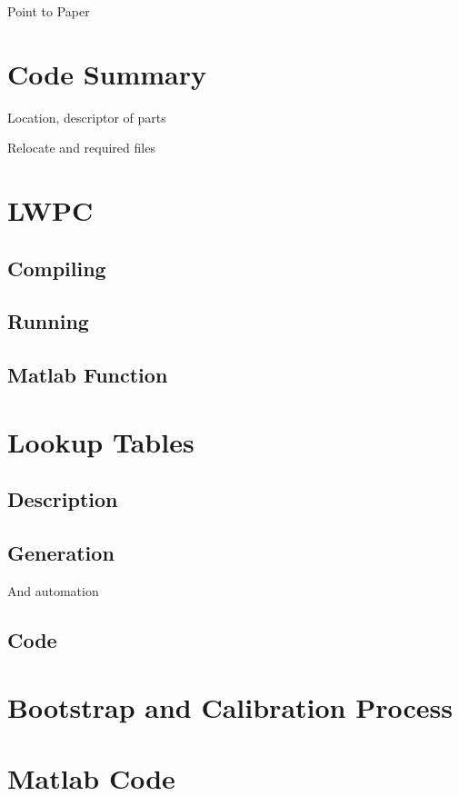 Point to Paper

\section{Code Summary}

Location, descriptor of parts

Relocate and required files

\section{LWPC}

\subsection{Compiling}

\subsection{Running}

\subsection{Matlab Function}

\section{Lookup Tables}

\subsection{Description}

\subsection{Generation}

And automation

\subsection{Code}

\section{Bootstrap and Calibration Process}

\section{Matlab Code}

